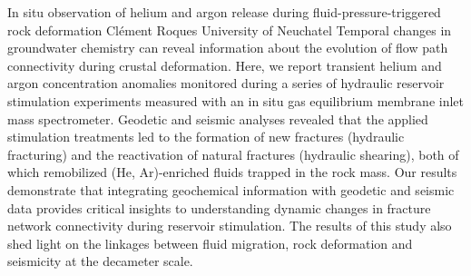 \begin{conf-abstract}
{In situ observation of helium and argon release during fluid-pressure-triggered rock deformation}
{Clément Roques}
{University of Neuchatel}
{Temporal changes in groundwater chemistry can reveal information about the evolution of flow path connectivity during crustal deformation. Here, we report transient helium and argon concentration anomalies monitored during a series of hydraulic reservoir stimulation experiments measured with an in situ gas equilibrium membrane inlet mass spectrometer. Geodetic and seismic analyses revealed that the applied stimulation treatments led to the formation of new fractures (hydraulic fracturing) and the reactivation of natural fractures (hydraulic shearing), both of which remobilized (He, Ar)-enriched fluids trapped in the rock mass. Our results demonstrate that integrating geochemical information with geodetic and seismic data provides critical insights to understanding dynamic changes in fracture network connectivity during reservoir stimulation. The results of this study also shed light on the linkages between fluid migration, rock deformation and seismicity at the decameter scale.}
\end{conf-abstract}
